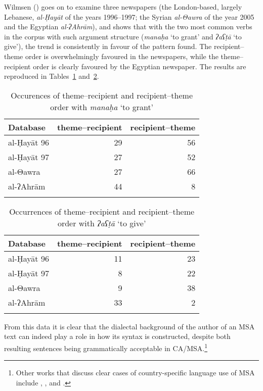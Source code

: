 \documentclass[output=paper]{langsci/langscibook}
\begin{document}
Wilmsen (\citeyear[114--115]{Wilmsen2010}) goes on to examine three newspapers (the London-based, largely Lebanese, \textit{al-Ḥayāt} of the years 1996--1997; the Syrian \textit{al-Θawra} of the year 2005 and the Egyptian \textit{al-ʔAhrām}), and shows that with the two most common verbs in the corpus with such argument structure (\textit{manaḥa} ‘to grant’ and \textit{ʔaʕṭā} ‘to give’), the trend is consistently in favour of the pattern found. The recipient–theme order is overwhelmingly favoured in the  newspapers, while the theme–recipient order is clearly favoured by the Egyptian newspaper. The results are reproduced in Tables~\ref{tab:vanputten:1} and~\ref{tab:vanputten:2}.


\begin{table}
\begin{tabular}{lrr}
\lsptoprule
{Database} & {theme–recipient} & {recipient–theme}\\\midrule
al-Ḥayāt 96 & 29 & 56\\
al-Ḥayāt 97 & 27 & 52\\
al-Θawra & 27 & 66\\
al-ʔAhrām & 44 & \hphantom{1}8\\
\lspbottomrule
\end{tabular}
\caption{\label{bkm:Ref533762442}\label{tab:vanputten:1}Occurences of theme–recipient and recipient–theme order with \textit{manaḥa} ‘to grant’}
\end{table}

\begin{table}
\begin{tabular}{lrr}
\lsptoprule
{Database} & {theme–recipient} & {recipient–theme}\\\midrule
al-Ḥayāt 96 & 11 & 23\\
al-Ḥayāt 97 & \hphantom{1}8 & 22\\
al-Θawra    &  \hphantom{1}9 & 38\\
al-ʔAhrām   & 33 &  \hphantom{1}2\\
\lspbottomrule
\end{tabular}
\caption{\label{bkm:Ref533762457}\label{tab:vanputten:2}Occurrences of theme–recipient and recipient–theme order with \textit{ʔaʕṭā} ‘to give’}
\end{table}

From this data it is clear that the dialectal background of the author of an MSA text can indeed play a role in how its syntax is constructed, despite both resulting sentences being grammatically acceptable in CA/MSA.\footnote{Other works that discuss clear cases of country-specific language use of MSA include \citet{Ibrahim2009}, \citet{Parkinson2003},  \citet{Parkinson2007} and \citet{ParkinsonIbrahim1999}.}
\end{document}
